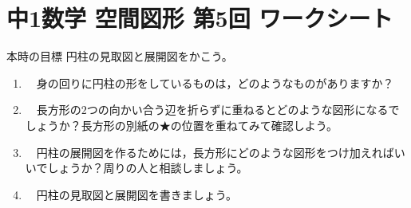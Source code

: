 \documentclass[fontsize=12pt,platex,dvipdfmx,standalone]{jlreq}			%
\theoremstyle{definition}
\begin{document}
\section*{中1数学 空間図形 第5回 ワークシート}
\vspace{-15.2mm}
\begin{itembox}[l]{本時の目標}
  円柱の見取図と展開図をかこう。
\end{itembox}

\vspace{-3mm}

\begin{enumerate}
\item 　身の回りに円柱の形をしているものは，どのようなものがありますか？
\begin{screen}
  \vspace{6mm}
\end{screen}
  \item 　長方形の$2$つの向かい合う辺を折らずに重ねるとどのような図形になるでしょうか？長方形の別紙の★の位置を重ねてみて確認しよう。
  
  \vspace{2mm}
  \begin{center}
\begin{adjustbox}{center}
\end{adjustbox}
\end{center}

\item 　円柱の展開図を作るためには，長方形にどのような図形をつけ加えればいいでしょうか？周りの人と相談しましょう。
\begin{screen}
  \vspace{7mm}
\end{screen}
\item 　円柱の見取図と展開図を書きましょう。


\begin{center}
  \begin{adjustbox}{center}
\end{adjustbox}
\end{center}
\end{enumerate}
\end{document}
